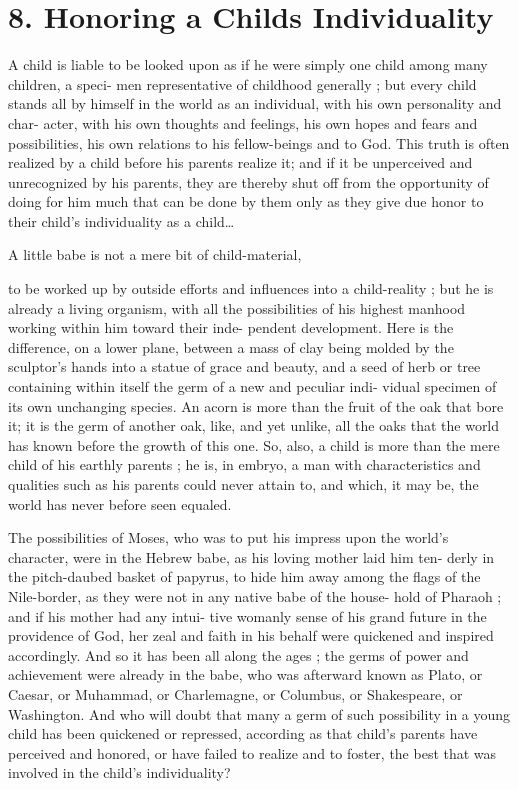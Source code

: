 \documentclass[
]{book}
\begin{document}
\hypertarget{honoring-a-childs-individuality}{%
\chapter{8. Honoring a Childs Individuality}\label{honoring-a-childs-individuality}}

A child is liable to be looked upon as if he were simply one child among many children, a speci- men representative of childhood generally ; but every child stands all by himself in the world as an individual, with his own personality and char- acter, with his own thoughts and feelings, his own hopes and fears and possibilities, his own relations to his fellow-beings and to God. This truth is often realized by a child before his parents realize it; and if it be unperceived and unrecognized by his parents, they are thereby shut off from the opportunity of doing for him much that can be done by them only as they give due honor to their child's individuality as a child\ldots{}

A little babe is not a mere bit of child-material,

to be worked up by outside efforts and influences into a child-reality ; but he is already a living organism, with all the possibilities of his highest manhood working within him toward their inde- pendent development. Here is the difference, on a lower plane, between a mass of clay being molded by the sculptor's hands into a statue of grace and beauty, and a seed of herb or tree containing within itself the germ of a new and peculiar indi- vidual specimen of its own unchanging species. An acorn is more than the fruit of the oak that bore it; it is the germ of another oak, like, and yet unlike, all the oaks that the world has known before the growth of this one. So, also, a child is more than the mere child of his earthly parents ; he is, in embryo, a man with characteristics and qualities such as his parents could never attain to, and which, it may be, the world has never before seen equaled.

The possibilities of Moses, who was to put his impress upon the world's character, were in the Hebrew babe, as his loving mother laid him ten- derly in the pitch-daubed basket of papyrus, to hide him away among the flags of the Nile-border, as they were not in any native babe of the house- hold of Pharaoh ; and if his mother had any intui- tive womanly sense of his grand future in the providence of God, her zeal and faith in his behalf were quickened and inspired accordingly. And so it has been all along the ages ; the germs of power and achievement were already in the babe, who was afterward known as Plato, or Caesar, or Muhammad, or Charlemagne, or Columbus, or Shakespeare, or Washington. And who will doubt that many a germ of such possibility in a young child has been quickened or repressed, according as that child's parents have perceived and honored, or have failed to realize and to foster, the best that was involved in the child's individuality?
\end{document}
